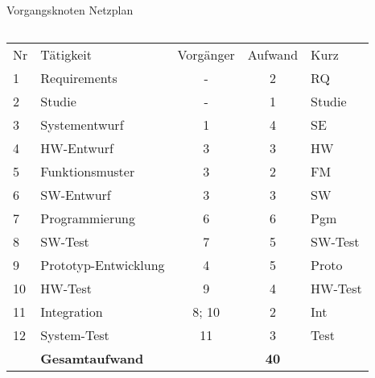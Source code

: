 \documentclass{beamer}
\begin{document}
\begin{frame}[t,shrink=60]{Vorgangsknoten Netzplan}

\begin{columns}

{\Large

\par\vspace{3cm}\noindent       %

    \begin{tabular}{l|lccl}
      \hline
      Nr & Tätigkeit        & Vorgänger & Aufwand & Kurz \\
      1  & Requirements     & -     & 2 & RQ \\
      2  & Studie           & -     & 1 & Studie \\
      3  & Systementwurf    & 1     & 4 & SE \\
      4  & HW-Entwurf       & 3     & 3 & HW \\
      5  & Funktionsmuster  & 3     & 2 & FM \\
      6  & SW-Entwurf       & 3     & 3 & SW \\
      7  & Programmierung   & 6     & 6 & Pgm \\
      8 & SW-Test          & 7     & 5 & SW-Test \\
      9 & Prototyp-Entwicklung & 4 & 5 & Proto \\
      10 & HW-Test          & 9    & 4 & HW-Test \\
      11 & Integration      & 8; 10 & 2 & Int \\
      12 & System-Test      & 11    & 3 & Test \\
      \hline
        & \textbf{Gesamtaufwand} &   & \textbf{40} \\
    \end{tabular}
}


\end{columns}
\end{frame}
\end{document}
